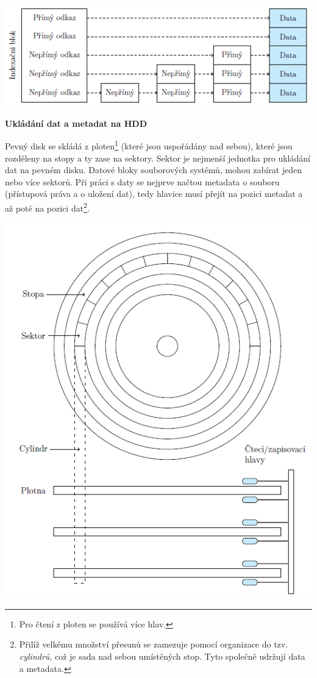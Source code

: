 \begin{center}
    \includegraphics[scale=1.2]{images/mem_block_index.png}
\end{center}

\begin{Large}
    \vspace{0,5cm}
    \textbf{Ukládání dat a metadat na HDD}
\end{Large}

Pevný disk se skládá z ploten\footnote{Pro čtení z ploten se používá více hlav.} (které jsou uspořádány nad sebou), které jsou rozděleny na stopy a ty zase na sektory. Sektor je nejmenší jednotka pro ukládání dat na pevném disku. Datové bloky souborových systémů, mohou zabírat jeden nebo více sektorů. Při práci s daty se nejprve načtou metadata o souboru (přístupová práva a o uložení dat), tedy hlavice musí přejít na pozici metadat a až poté na pozici dat\footnote{Přilíž velkému množství přesunů se zamezuje pomocí organizace do tzv. \textit{cylindrů}, což je sada nad sebou umístěných stop. Tyto společně udržují data a metadata.}.  

\begin{center}
    \includegraphics[scale=1]{BPC-SOS/images/mem_hdd.png}
\end{center}

